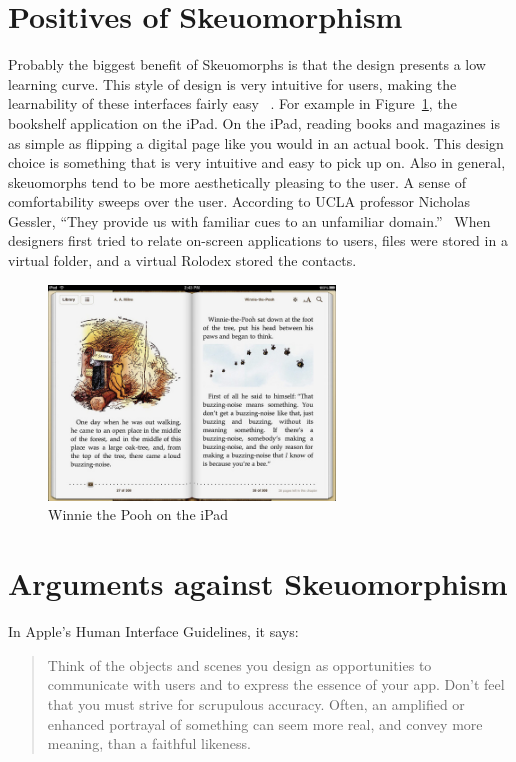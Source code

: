 \documentclass{article}
\begin{document}
\section{Positives of Skeuomorphism}

Probably the biggest benefit of Skeuomorphs is that the design presents a low learning curve. This style of design is very intuitive for users, making the learnability of these interfaces fairly easy ~\cite{Former-UI}. For example in Figure~\ref{book}, the bookshelf application on the iPad. On the iPad, reading books and magazines is as simple as flipping a digital page like you would in an actual book. This design choice is something that is very intuitive and easy to pick up on. Also in general, skeuomorphs tend to be more aesthetically pleasing to the user. A sense of comfortability sweeps over the user. According to UCLA professor Nicholas Gessler, “They provide us with familiar cues to an unfamiliar domain.”~\cite{Gessler} When designers first tried to relate on-screen applications to users, files were stored in a virtual folder, and a virtual Rolodex stored the contacts. ~\cite{FastCompany3}
\begin{figure}
\centering
\includegraphics[width=3in]{ipadBook.jpeg} 

\caption{Winnie the Pooh on the iPad}
\label{book}
\end{figure}
\section{Arguments against Skeuomorphism}

In Apple’s Human Interface Guidelines, it says:

\begin{quote}Think of the objects and scenes you design as opportunities to communicate with users and to express the essence of your app. Don't feel that you must strive for scrupulous accuracy. Often, an amplified or enhanced portrayal of something can seem more real, and convey more meaning, than a faithful likeness.\end{quote}
\end{document}
